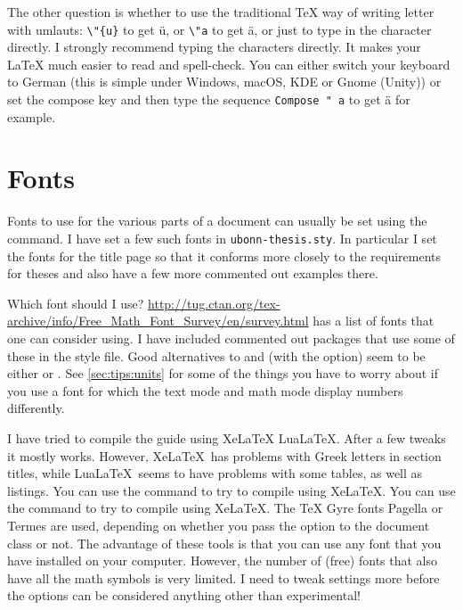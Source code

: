 The other question is whether to use the traditional \TeX{} way of
writing letter with umlauts: \verb+\"{u}+ to get \"{u}, or \verb+\"a+
to get \"a, or just to type in the character directly. I strongly
recommend typing the characters directly. It makes your \LaTeX{} much
easier to read and spell-check. You can either switch your keyboard to
German (this is simple under Windows, macOS, KDE or Gnome (Unity)) or set the
compose key and then type the sequence \texttt{Compose " a} to get ä for example. %


\section{Fonts}%
\label{sec:layout:font}

Fonts to use for the various parts of a
document can usually be set using the  command.
I have set a few such fonts in \texttt{ubonn-thesis.sty}.
In particular
I set the fonts for the title page so that it conforms more closely to
the requirements for theses and also have a few more commented out
examples there.

Which font should I use?
\url{http://tug.ctan.org/tex-archive/info/Free_Math_Font_Survey/en/survey.html}
has a list of fonts that one can consider using.
I have included
commented out packages that use some of these in the style file.
Good alternatives to  and  (with the  option) seem
to be either  or .
See \cref{sec:tips:units} for some of the things you have to worry
about if you use a font for which the text mode and math mode display
numbers differently.

I have tried to compile the guide using Xe\LaTeX{} Lua\LaTeX{}.
After a few tweaks it mostly works.
However, Xe\LaTeX\ has problems with Greek letters in section titles, while
Lua\LaTeX\ seems to have problems with some tables, as well as listings.
You can use the command  to try to compile using Xe\LaTeX.
You can use the command  to try to compile using Xe\LaTeX.
The TeX Gyre fonts Pagella or Termes are used, depending on whether you pass the
 option to the document class or not.
The advantage of these tools is that you can use any font that you have installed on your computer.
However, the number of (free) fonts that also have all the math symbols is very limited.
I need to tweak settings more before the options can be considered anything other than experimental!


